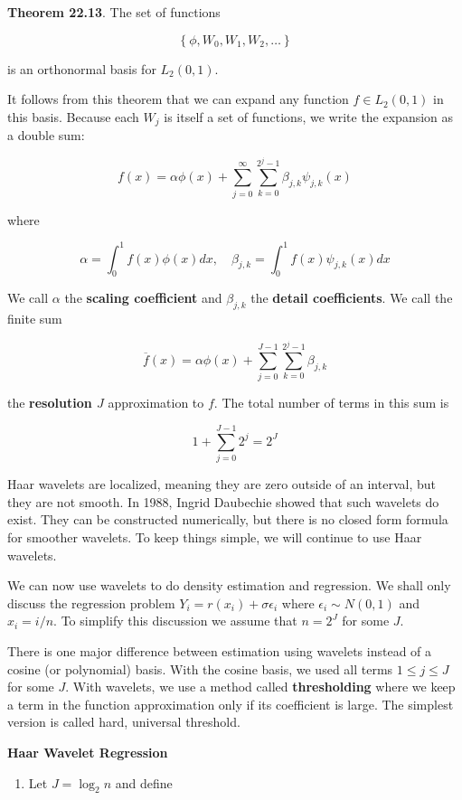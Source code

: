 \textbf{Theorem 22.13}. The set of functions

\[ \left\{ \phi, W_0, W_1, W_2, \dots \right\} \]

is an orthonormal basis for \(L_2(0, 1)\).

It follows from this theorem that we can expand any function
\(f \in L_2(0, 1)\) in this basis. Because each \(W_j\) is itself a set
of functions, we write the expansion as a double sum:

\[ f(x) = \alpha \phi(x) + \sum_{j=0}^\infty \sum_{k=0}^{2^j - 1} \beta_{j, k} \psi_{j, k}(x) \]

where

\[ \alpha = \int_0^1 f(x) \phi(x) dx, \quad \beta_{j, k} = \int_0^1 f(x) \psi_{j, k}(x) dx\]

We call \(\alpha\) the \textbf{scaling coefficient} and \(\beta_{j, k}\)
the \textbf{detail coefficients}. We call the finite sum

\[ \overline{f}(x) = \alpha \phi(x) + \sum_{j=0}^{J - 1} \sum_{k=0}^{2^j - 1} \beta_{j, k}\]

the \textbf{resolution \(J\)} approximation to \(f\). The total number
of terms in this sum is

\[ 1 + \sum_{j=0}^{J - 1}2^j = 2^J\]

Haar wavelets are localized, meaning they are zero outside of an
interval, but they are not smooth. In 1988, Ingrid Daubechie showed that
such wavelets do exist. They can be constructed numerically, but there
is no closed form formula for smoother wavelets. To keep things simple,
we will continue to use Haar wavelets.

We can now use wavelets to do density estimation and regression. We
shall only discuss the regression problem
\(Y_i = r(x_i) + \sigma \epsilon_i\) where \(\epsilon_i \sim N(0, 1)\)
and \(x_i = i / n\). To simplify this discussion we assume that
\(n = 2^J\) for some \(J\).

There is one major difference between estimation using wavelets instead
of a cosine (or polynomial) basis. With the cosine basis, we used all
terms \(1 \leq j \leq J\) for some \(J\). With wavelets, we use a method
called \textbf{thresholding} where we keep a term in the function
approximation only if its coefficient is large. The simplest version is
called hard, universal threshold.

\textbf{Haar Wavelet Regression}

\begin{enumerate}[tightlist,label={\arabic*.}]
\item
  Let \(J = \log_2 n\) and define
\end{enumerate}

